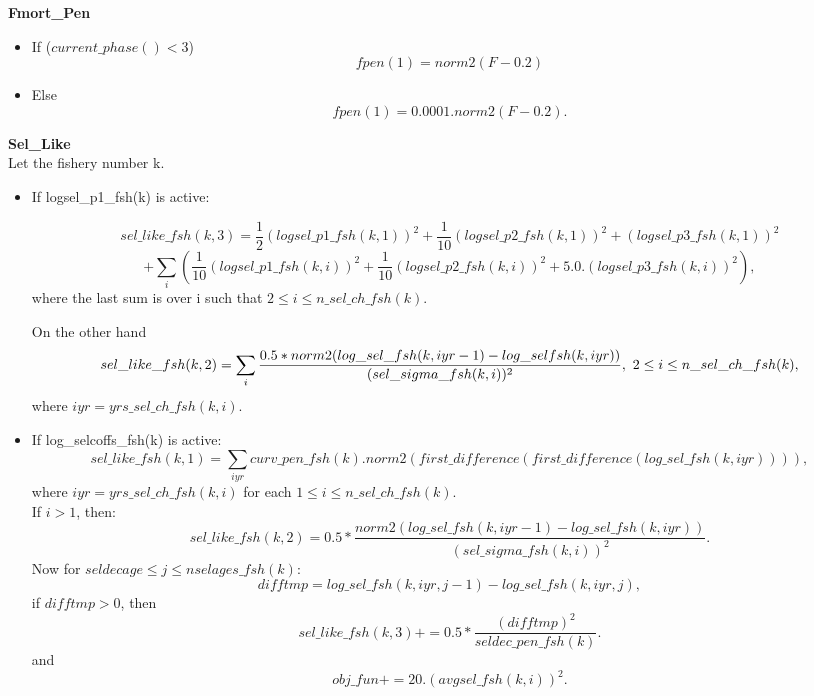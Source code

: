 \documentclass{article}
\begin{document}
\textbf{Fmort\_Pen}\\


\begin{itemize}
    \item If ($current\_phase()<3$)
    \begin{equation}
        fpen(1)=norm2(F-0.2)
    \end{equation}
    \item Else
    \begin{equation}
        fpen(1)=0.0001.norm2(F-0.2).
    \end{equation}
\end{itemize}

\textbf{Sel\_Like}\\

Let the fishery number k. 

\begin{itemize}
    \item If logsel\_p1\_fsh(k) is active: 


\begin{equation}
sel\_like\_fsh(k,3)= \dfrac{1}{2}(logsel\_p1\_fsh(k,1))^2+\dfrac{1}{10}(logsel\_p2\_fsh(k,1))^2+(logsel\_p3\_fsh(k,1))^2
\end{equation}
\begin{equation*}
    +\sum_{i}\left(\dfrac{1}{10}( logsel\_p1\_fsh(k,i))^2+\dfrac{1}{10}(logsel\_p2\_fsh(k,i))^2+ 5.0.(logsel\_p3\_fsh(k,i))^2\right),
\end{equation*}
where the last sum is over i such that $2 \leq i \leq n\_sel\_ch\_fsh(k)$.

On the other hand
\begin{equation}
    sel\_like\_fsh(k,2)=\sum_{i}\dfrac{0.5*norm2(log\_sel\_fsh(k,iyr-1)-log\_sel\-fsh(k,iyr))}{(sel\_sigma\_fsh(k,i))^2}, \  2 \leq i \leq n\_sel\_ch\_fsh(k),
\end{equation}
where  $iyr=yrs\_sel\_ch\_fsh(k,i)$.

\item If log\_selcoffs\_fsh(k) is active:
\begin{equation}
    sel\_like\_fsh(k,1) = \sum_{iyr}curv\_pen\_fsh(k).norm2(first\_difference( first\_difference(log\_sel\_fsh(k,iyr)))),
\end{equation}
where $iyr = yrs\_sel\_ch\_fsh(k,i)$ for each $1\leq i \leq n\_sel\_ch\_fsh(k)$.\\

If $i>1$, then:
\begin{equation}
    sel\_like\_fsh(k,2)  = 0.5*\dfrac{norm2( log\_sel\_fsh(k,iyr-1) - log\_sel\_fsh(k,iyr) )}{(sel\_sigma\_fsh(k,i))^2}. 
\end{equation}
Now for $seldecage \leq j \leq nselages\_fsh(k)$:
\begin{equation}
    difftmp=log\_sel\_fsh(k,iyr,j-1)-log\_sel\_fsh(k,iyr,j), 
\end{equation}
if $difftmp>0$, then
\begin{equation}
    sel\_like\_fsh(k,3)    += 0.5*\dfrac{( difftmp )^2}{seldec\_pen\_fsh(k)}.
\end{equation}
and 
\begin{equation}
    obj\_fun            += 20 . (avgsel\_fsh(k,i))^2.
\end{equation}
\end{itemize}
\end{document}
